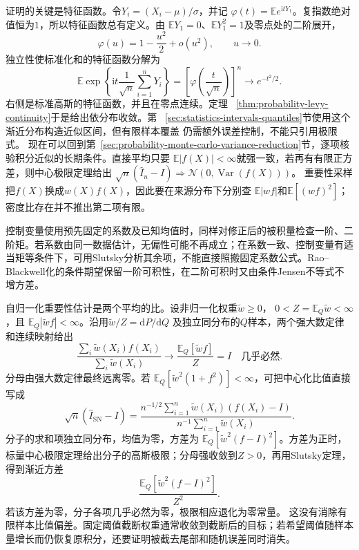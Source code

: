 证明的关键是特征函数。令\(Y_i=(X_i-\mu)/\sigma\)，并记
\(\varphi(t)=\mathbb{E}e^{\mathrm{i}tY_1}\)。复指数绝对值恒为\(1\)，所以特征函数总有定义。由
\(\mathbb{E}Y_1=0\)、\(\mathbb{E}Y_1^2=1\)及零点处的二阶展开，
\[
  \varphi(u)=1-\frac{u^2}{2}+o(u^2),
  \qquad u\to0.
\]
独立性使标准化和的特征函数分解为
\[
  \mathbb{E}\exp\left\{
    \mathrm{i}t\frac{1}{\sqrt n}\sum_{i=1}^{n}Y_i
  \right\}
  =
  \left[\varphi\left(\frac{t}{\sqrt n}\right)\right]^n
  \longrightarrow e^{-t^2/2}.
\]
右侧是标准高斯的特征函数，并且在零点连续。定理
~\ref{thm:probability-levy-continuity}于是给出依分布收敛。第
~\ref{sec:statistics-intervals-quantiles}节使用这个渐近分布构造近似区间，但有限样本覆盖
仍需额外误差控制，不能只引用极限式。
现在可以回到第~\ref{sec:probability-monte-carlo-variance-reduction}节，逐项核验积分近似的长期条件。直接平均只要
\(\mathbb E|f(X)|<\infty\)就强一致，若再有有限正方差，则中心极限定理给出
\(\sqrt n(\widehat I_n-I)\Rightarrow\mathcal N(0,\operatorname{Var}(f(X)))\)。
重要性采样把\(f(X)\)换成\(w(X)f(X)\)，因此要在来源分布下分别查
\(\mathbb E|wf|\)和\(\mathbb E[(wf)^2]\)；密度比存在并不推出第二项有限。

控制变量使用预先固定的系数及已知均值时，同样对修正后的被积量检查一阶、二阶矩。若系数由同一数据估计，无偏性可能不再成立；在系数一致、控制变量有适当矩等条件下，可用Slutsky分析其余项，不能直接照搬固定系数公式。Rao--Blackwell化的条件期望保留一阶可积性，在二阶可积时又由条件Jensen不等式不增方差。

自归一化重要性估计是两个平均的比。设非归一化权重\(\widetilde w\geq0\)，
\(0<Z=\mathbb E_Q\widetilde w<\infty\)，且
\(\mathbb E_Q|\widetilde wf|<\infty\)。沿用\(\widetilde w/Z=\mathrm dP/\mathrm dQ\)
及独立同分布的\(Q\)样本，两个强大数定律和连续映射给出
\[
\frac{\sum_i\widetilde w(X_i)f(X_i)}
{\sum_i\widetilde w(X_i)}
\longrightarrow
\frac{\mathbb E_Q[\widetilde wf]}Z=I
\quad\text{几乎必然}.
\]
分母由强大数定律最终远离零。若
\(\mathbb E_Q[\widetilde w^2(1+f^2)]<\infty\)，可把中心化比值直接写成
\[
 \sqrt n(\widehat I_{\mathrm{SN}}-I)
 =\frac{n^{-1/2}\sum_{i=1}^n
       \widetilde w(X_i)(f(X_i)-I)}
       {n^{-1}\sum_{i=1}^n\widetilde w(X_i)}.
\]
分子的求和项独立同分布，均值为零，方差为
\(\mathbb E_Q[\widetilde w^2(f-I)^2]\)。方差为正时，标量中心极限定理给出分子的高斯极限；分母强收敛到\(Z>0\)，再用Slutsky定理，得到渐近方差
\[
\frac{\mathbb E_Q[\widetilde w^2(f-I)^2]}{Z^2}.
\]
若该方差为零，分子各项几乎必然为零，极限相应退化为零常量。
这没有消除有限样本比值偏差。固定阈值截断权重通常收敛到截断后的目标；若希望阈值随样本量增长而仍恢复原积分，还要证明被截去尾部和随机误差同时消失。


